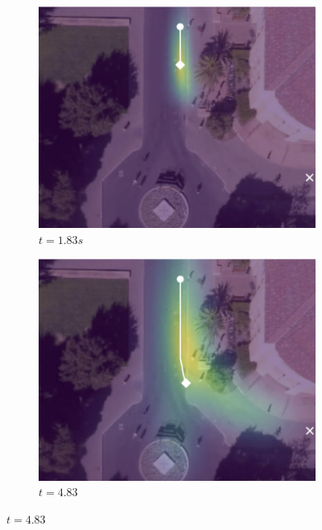 \documentclass[letterpaper,10pt,conference]{ieeeconf}
\begin{document}
\begin{figure}
	\centering
	\begin{subfigure}[b]{.45\linewidth}
		\includegraphics[width=\linewidth]{./figures/FirstPage/gates_1_2_t=55.jpg}
		\caption{$t=1.83s$}
	\end{subfigure}
		\begin{subfigure}[b]{.45\linewidth}
			\includegraphics[width=\linewidth]{./figures/FirstPage/gates_1_2_t=145.jpg}
			\caption{$t=4.83$}
		\end{subfigure}
	

\end{figure}
\end{document}
